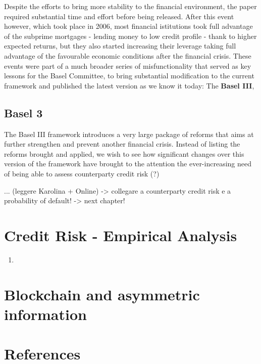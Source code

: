\documentclass[a4paper,12pt]{article}
\begin{document}
    Despite the efforts to bring more stability to the financial environment, the paper required substantial time and effort before being released. After this event however, which took place in 2006,
    most financial istitutions took full advantage of the subprime mortgages - lending money to low credit profile - thank to higher expected returns, but they also started increasing their leverage
    taking full advantage of the favourable economic conditions after the financial crisis. These events were part of a much broader series of misfunctionality that served as key lessons for the Basel 
    Committee, to bring substantial modification to the current framework and published the latest version as we know it today: The \textbf{Basel III},

    \subsection[]{Basel 3}
    The Basel III framework introduces a very large package of reforms that aims at further strengthen and prevent another financial crisis. Instead of listing the reforms brought and applied, we wish
    to see how significant changes over this version of the framework have brought to the attention the ever-increasing need of being able to assess counterparty credit risk (?)

... (leggere Karolina + Online) -> collegare a counterparty credit risk e a probability of default! -> next chapter!

    \pagebreak
    \section{Credit Risk - Empirical Analysis}

    \begin{enumerate}
        \item 
    \end{enumerate}
    
    \pagebreak
    \section{Blockchain and asymmetric information}

    \pagebreak
    \section{References}
\end{document}
